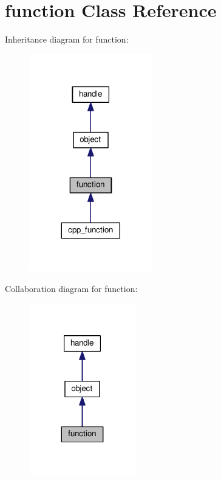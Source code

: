 \hypertarget{classfunction}{}\section{function Class Reference}
\label{classfunction}


Inheritance diagram for function\+:
\nopagebreak
\begin{figure}[H]
\begin{center}
\leavevmode
\includegraphics[width=152pt]{classfunction__inherit__graph}
\end{center}
\end{figure}


Collaboration diagram for function\+:
\nopagebreak
\begin{figure}[H]
\begin{center}
\leavevmode
\includegraphics[width=131pt]{classfunction__coll__graph}
\end{center}
\end{figure}
